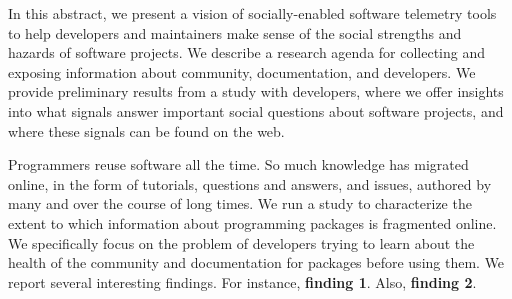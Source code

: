 In this abstract, we present a vision of socially-enabled software telemetry tools to help developers and maintainers make sense of the social strengths and hazards of software projects.
We describe a research agenda for collecting and exposing information about community, documentation, and developers.
We provide preliminary results from a study with developers, where we offer insights into what signals answer important social questions about software projects, and where these signals can be found on the web.

Programmers reuse software all the time.
So much knowledge has migrated online, in the form of tutorials, questions and answers, and issues, authored by many and over the course of long times.
We run a study to characterize the extent to which information about programming packages is fragmented online.
We specifically focus on the problem of developers trying to learn about the health of the community and documentation for packages before using them.
We report several interesting findings.
For instance, \textbf{finding 1}.
Also, \textbf{finding 2}.
\fi
